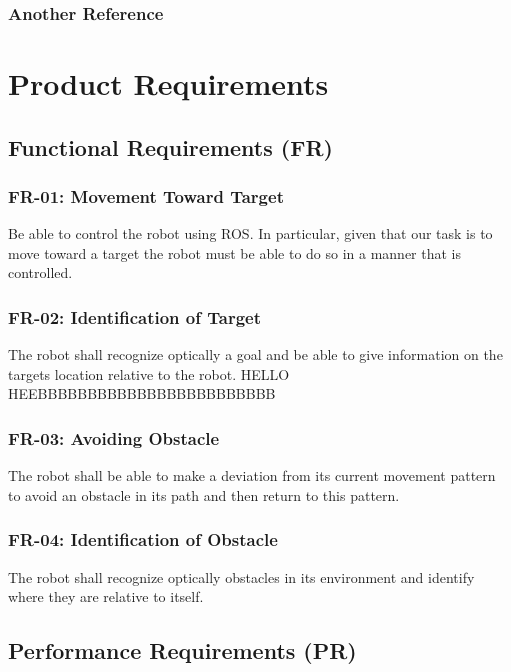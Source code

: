 \documentclass[]{report}
\begin{document}
\subsection{Another Reference}

\chapter{Product Requirements}

\section{Functional Requirements (FR)}

\subsection{FR-01: Movement Toward Target}

Be able to control the robot using ROS. In particular, given that our task is to move toward a target the robot must be able to do so in a manner that is controlled.

\subsection{FR-02: Identification of Target}

The robot shall recognize optically a goal and be able to give information on the targets location relative to the robot. HELLO HEEBBBBBBBBBBBBBBBBBBBBBBBB

\subsection{FR-03: Avoiding Obstacle}

The robot shall be able to make a deviation from its current movement pattern to avoid an obstacle in its path and then return to this pattern.

\subsection{FR-04: Identification of Obstacle}

The robot shall recognize optically obstacles in its environment and identify where they are relative to itself.

\section{Performance Requirements (PR)}
\end{document}
